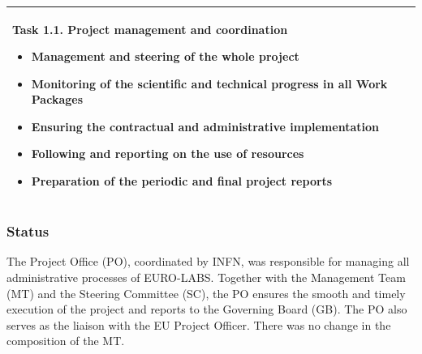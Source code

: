 \begin{table}[H]
{\begin{tabular}{|p{}|}
        \hline
        \rowcolor{white} 
        \hspace*{-0.75cm} 
        \begin{minipage}[t]{\textwidth}
        \setlength{\parindent}{15pt}
                Task 1.1. Project management and coordination
    		\begin{itemize}
    		    \item Management and steering of the whole project
                    \item Monitoring of the scientific and technical progress in all Work Packages
                    \item Ensuring the contractual and administrative implementation
                    \item Following and reporting on the use of resources
                    \item Preparation of the periodic and final project reports
    		\end{itemize} 
    		\vspace*{0.10em}
	\end{minipage}        
        \\
        \hline
    \end{tabular}}
    \vspace{0.5em}\vfill
\end{table}




\subsubsection*{Status}
The Project Office (PO), coordinated by INFN, was responsible for managing all administrative processes
of EURO-LABS. Together with the Management Team (MT) and the Steering Committee
(SC), the PO ensures the smooth and timely execution of the project and reports to the Governing
Board (GB). The PO also serves as the liaison with the EU Project Officer. There was no change in the composition of the MT.

